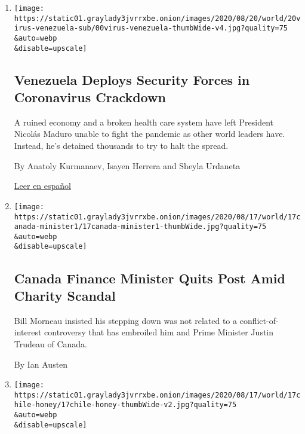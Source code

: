 \begin{enumerate}
\def\labelenumi{\arabic{enumi}.}
\item
  \href{/2020/08/19/world/americas/coronavirus-venezuela.html}{}

  \texttt{[image: https://static01.graylady3jvrrxbe.onion/images/2020/08/20/world/20virus-venezuela-sub/00virus-venezuela-thumbWide-v4.jpg?quality=75\\\&auto=webp\\\&disable=upscale]}

  \hypertarget{venezuela-deploys-security-forces-in-coronavirus-crackdown}{%
  \subsection{Venezuela Deploys Security Forces in Coronavirus
  Crackdown}\label{venezuela-deploys-security-forces-in-coronavirus-crackdown}}

  A ruined economy and a broken health care system have left President
  Nicolás Maduro unable to fight the pandemic as other world leaders
  have. Instead, he's detained thousands to try to halt the spread.

  By Anatoly Kurmanaev, Isayen Herrera and Sheyla Urdaneta

  \href{https://www.nytimes3xbfgragh.onion/es/2020/08/19/espanol/america-latina/venezuela-represion-coronavirus.html}{Leer
  en español}
\item
  \href{/2020/08/17/world/canada/finance-minister-resigns-trudeau.html}{}

  \texttt{[image: https://static01.graylady3jvrrxbe.onion/images/2020/08/17/world/17canada-minister1/17canada-minister1-thumbWide.jpg?quality=75\\\&auto=webp\\\&disable=upscale]}

  \hypertarget{canada-finance-minister-quits-post-amid-charity-scandal}{%
  \subsection{Canada Finance Minister Quits Post Amid Charity
  Scandal}\label{canada-finance-minister-quits-post-amid-charity-scandal}}

  Bill Morneau insisted his stepping down was not related to a
  conflict-of-interest controversy that has embroiled him and Prime
  Minister Justin Trudeau of Canada.

  By Ian Austen
\item
  \href{/2020/08/17/world/americas/honey-mel-gibson-chile.html}{}

  \texttt{[image: https://static01.graylady3jvrrxbe.onion/images/2020/08/17/world/17chile-honey/17chile-honey-thumbWide-v2.jpg?quality=75\\\&auto=webp\\\&disable=upscale]}


\end{enumerate}
